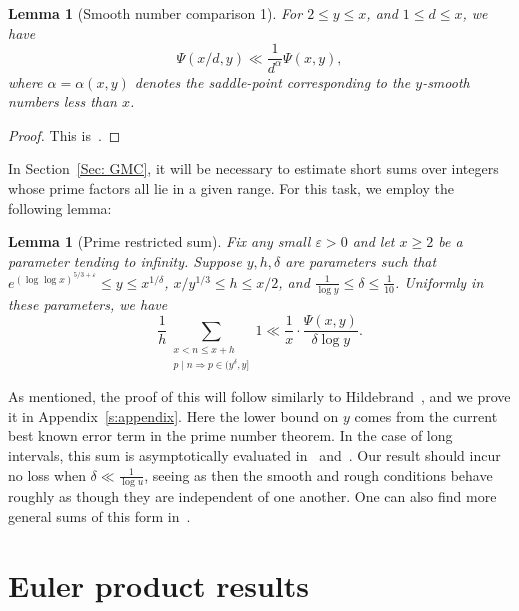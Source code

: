 \documentclass[12pt,a4paper,reqno]{amsart}
\numberwithin{equation}{section}
\def\leq {\leqslant}
\newtheorem{lemma}[theorem]{Lemma}
\theoremstyle{remark}
\theoremstyle{definition}
\numberwithin{equation}{section}
\theoremstyle{remark}
\begin{document}
\begin{lemma}[Smooth number comparison 1]\label{l: smooths below x/d vs below x}
For $2 \leq y \leq x$, and $1 \leq d \leq x$, we have
\[
\Psi(x/d, y) \ll \frac{1}{d^{\alpha}} \Psi(x, y) ,
\]
where $\alpha = \alpha (x, y)$ denotes the saddle-point corresponding to the $y$-smooth numbers less than $x$.
\end{lemma}
\begin{proof}
This is~\cite[Théorème~2.4(i)]{BretecheTenenbaum}.
\end{proof}

In Section~\ref{Sec: GMC}, it will be necessary to estimate short sums over integers whose prime factors all lie in a given range. For this task, we employ the following lemma:

\begin{lemma}[Prime restricted sum]\label{l: smooths in short intervals estimate}
Fix any small $\varepsilon > 0$ and let $x \geq 2$ be a parameter tending to infinity. Suppose $y, h, \delta$ are parameters such that $e^{(\log \log x)^{5/3 + \varepsilon}} \leq y \leq x^{1/\delta}$, $x/y^{1/3} \leq h \leq x/2$, and $\frac{1}{\log y} \leq \delta \leq \frac{1}{10}$. Uniformly in these parameters, we have
\[
\frac{1}{h} \sum_{\substack{x < n \leq x + h \\ p \mid n \Rightarrow p \in (y^\delta, y]}} 1 \ll \frac{1}{x} \cdot \frac{\Psi(x,y)}{\delta \log y} .
\]
\end{lemma}
As mentioned, the proof of this will follow similarly to Hildebrand~\cite[Theorem~3]{Hildebrand}, and we prove it in Appendix~\ref{s:appendix}. Here the lower bound on $y$ comes from the current best known error term in the prime number theorem. In the case of long intervals, this sum is asymptotically evaluated in~\cite[Théorème~2.1]{BretecheTenenbaum} and~\cite[Theorem~1]{Xuan}. Our result should incur no loss when $\delta \ll \frac{1}{\log u}$, seeing as then the smooth and rough conditions behave roughly as though they are independent of one another.  One can also find more general sums of this form in~\cite{Friedlander}.


\section{Euler product results}\label{Sec: Euler}
\end{document}
